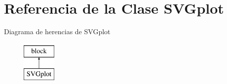 \hypertarget{classSVGplot}{\section{\-Referencia de la \-Clase \-S\-V\-Gplot}
\label{classSVGplot}
}
\-Diagrama de herencias de \-S\-V\-Gplot\begin{figure}[H]
\begin{center}
\leavevmode
\includegraphics[height=2.000000cm]{classSVGplot}
\end{center}
\end{figure}
